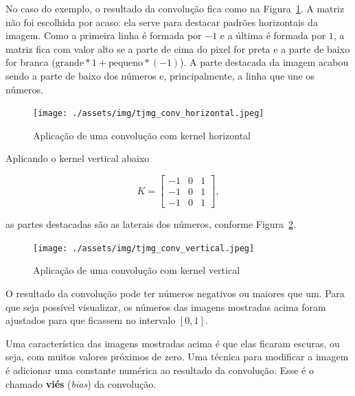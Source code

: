 \documentclass[12pt,twoside,brazilian]{book}
\begin{document}
No caso do exemplo, o resultado da convolução fica como na
Figura~\ref{fig-tjmg-exemplo-conv-horizontal}. A matriz não foi
escolhida por acaso: ela serve para destacar padrões horizontais da
imagem. Como a primeira linha é formada por \(-1\) e a última é formada
por \(1\), a matriz fica com valor alto se a parte de cima do pixel for
preta e a parte de baixo for branca
(\(\text{grande} * 1 + \text{pequeno} * (-1)\)). A parte destacada da
imagem acabou sendo a parte de baixo dos números e, principalmente, a
linha que une os números.

\begin{figure}

{\centering \texttt{[image: ./assets/img/tjmg\_conv\_horizontal.jpeg]}

}

\caption{\label{fig-tjmg-exemplo-conv-horizontal}Aplicação de uma
convolução com kernel horizontal}

\end{figure}

Aplicando o kernel vertical abaixo

\[
K = \left[\begin{array}{rrr}-1&0&1\\-1&0&1\\-1&0&1\end{array}\right],
\]

as partes destacadas são as laterais dos números, conforme
Figura~\ref{fig-tjmg-exemplo-conv-vertical}.

\begin{figure}

{\centering \texttt{[image: ./assets/img/tjmg\_conv\_vertical.jpeg]}

}

\caption{\label{fig-tjmg-exemplo-conv-vertical}Aplicação de uma
convolução com kernel vertical}

\end{figure}

O resultado da convolução pode ter números negativos ou maiores que um.
Para que seja possível visualizar, os números das imagens mostradas
acima foram ajustados para que ficassem no intervalo \([0,1]\).

Uma característica das imagens mostradas acima é que elas ficaram
escuras, ou seja, com muitos valores próximos de zero. Uma técnica para
modificar a imagem é adicionar uma constante numérica ao resultado da
convolução. Esse é o chamado \textbf{viés} (\emph{bias}) da convolução.
\end{document}
